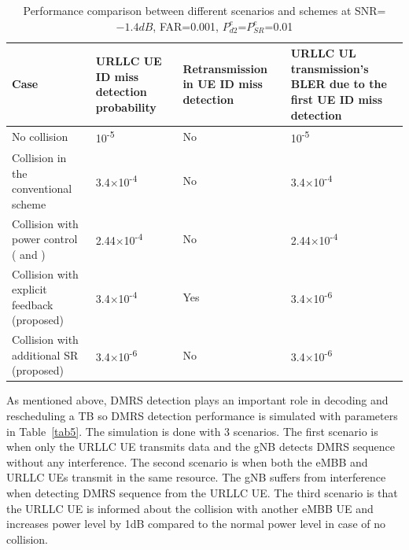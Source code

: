 \documentclass{ieeeaccess}
\begin{document}
\begin{table}[htbp]
\caption{Performance comparison between different scenarios and schemes at SNR=$-1.4dB$, FAR=0.001, $P^{e}_{d2}$=$P^{e}_{SR}$=0.01}
\begin{center}
\begin{tabular}{|p{19em}|p{9em}|p{10em}|p{12em}|}
 \hline
 \textbf{Case} & \textbf{URLLC UE ID miss detection probability}& \textbf{Retransmission in UE ID miss detection}& \textbf{URLLC UL transmission's BLER due to the first UE ID miss detection}\\
 \hline
 No collision  & 10\textsuperscript{-5}&No&10\textsuperscript{-5}\\
 \hline
 Collision in the conventional scheme& 3.4$\times$10\textsuperscript{-4}&No&3.4$\times$10\textsuperscript{-4}\\
 \hline
 Collision with power control (\cite{ref13} and \cite {ref14})&2.44$\times$10\textsuperscript{-4}&No&2.44$\times$10\textsuperscript{-4}\\
 \hline
 Collision with explicit feedback (proposed)& 3.4$\times$10\textsuperscript{-4}&Yes&3.4$\times$10\textsuperscript{-6}\\
\hline
 Collision with additional SR (proposed)& 3.4$\times$10\textsuperscript{-6}&No&3.4$\times$10\textsuperscript{-6}\\

 
 \hline
\end{tabular}
\label{tab10}
\end{center}
\vspace{-6mm}
\end{table}

As mentioned above, DMRS detection plays an important role in decoding and rescheduling a TB so DMRS detection performance is simulated with parameters in Table~\ref{tab5}. The simulation is done with 3 scenarios. The first scenario is when only the URLLC UE transmits data and the gNB detects DMRS sequence without any interference. The second scenario is when both the eMBB and URLLC UEs transmit in the same resource. The gNB suffers from interference when detecting DMRS sequence from the URLLC UE. The third scenario is that the URLLC UE is informed about the collision with another eMBB UE and increases power level by 1dB compared to the normal power level in case of no collision.
\end{document}
